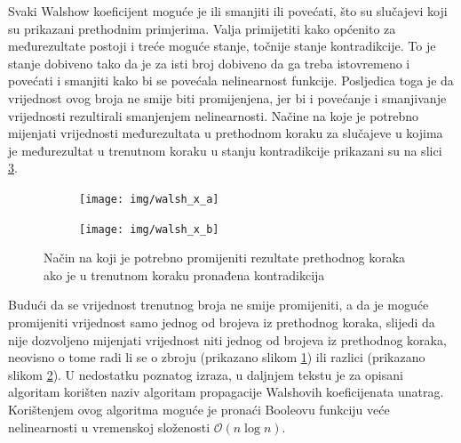 Svaki Walshow koeficijent moguće je ili smanjiti ili povećati, što su slučajevi koji su prikazani prethodnim primjerima.
Valja primijetiti kako općenito za međurezultate postoji i treće moguće stanje, točnije stanje kontradikcije.
To je stanje dobiveno tako da je za isti broj dobiveno da ga treba istovremeno i povećati i smanjiti kako bi se povećala nelinearnost funkcije.
Posljedica toga je da vrijednost ovog broja ne smije biti promijenjena, jer bi i povećanje i smanjivanje vrijednosti rezultirali smanjenjem nelinearnosti.
Načine na koje je potrebno mijenjati vrijednosti međurezultata u prethodnom koraku za slučajeve u kojima je međurezultat u trenutnom koraku u stanju kontradikcije prikazani su na slici \ref{fig:walsh_x}.
\begin{figure}[th!]
    \centering
    \begin{subfigure}{.5\textwidth}
        \centering
        \texttt{[image: img/walsh\_x\_a]}
        \captionsetup{justification=centering}
        \caption{}
        \label{fig:walsh_x_a}
    \end{subfigure}%
    \begin{subfigure}{.5\textwidth}
        \centering
        \texttt{[image: img/walsh\_x\_b]}
        \captionsetup{justification=centering}
        \caption{}
        \label{fig:walsh_x_b}
    \end{subfigure}
    \caption{Način na koji je potrebno promijeniti rezultate prethodnog koraka ako je u trenutnom koraku pronađena kontradikcija}
    \label{fig:walsh_x}
\end{figure}
Budući da se vrijednost trenutnog broja ne smije promijeniti, a da je moguće promijeniti vrijednost samo jednog od brojeva iz prethodnog koraka, slijedi da nije dozvoljeno mijenjati vrijednost niti jednog od brojeva iz prethodnog koraka, neovisno o tome radi li se o zbroju (prikazano slikom \ref{fig:walsh_x_a}) ili razlici (prikazano slikom \ref{fig:walsh_x_b}).
U nedostatku poznatog izraza, u daljnjem tekstu je za opisani algoritam korišten naziv algoritam propagacije Walshovih koeficijenata unatrag.
Korištenjem ovog algoritma moguće je pronaći Booleovu funkciju veće nelinearnosti u vremenskoj složenosti $\mathcal{O}(n\log n)$.

